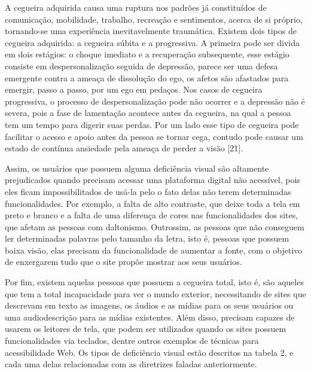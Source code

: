 \documentclass[a4paper]{article}
\begin{document}
\begin{titlepage}
A cegueira adquirida causa uma ruptura nos padrões já constituídos de comunicação, mobilidade, trabalho, recreação e sentimentos, acerca de si próprio, tornando-se uma experiência inevitavelmente traumática. Existem dois tipos de cegueira adquirida: a cegueira súbita e a progressiva. A primeira pode ser divida em dois estágios: o choque imediato e a recuperação subsequente, esse estágio consiste em despersonalização seguida de depressão, parece ser uma defesa emergente contra a ameaça de dissolução do ego, os afetos são afastados para emergir, passo a passo, por um ego em pedaços. Nos casos de cegueira progressiva, o processo de despersonalização pode não ocorrer e a depressão não é severa, pois a fase de lamentação acontece antes da cegueira, na qual a pessoa tem um tempo para digerir suas perdas. Por um lado esse tipo de cegueira pode facilitar o acesso e apoio antes da pessoa se tornar cega, contudo pode causar um estado de contínua ansiedade pela ameaça de perder a visão [21].

Assim, os usuários que possuem alguma deficiência visual são altamente prejudicados quando precisam acessar uma plataforma digital não acessível, pois eles ficam impossibilitados de usá-la pelo o fato delas não terem determinadas funcionalidades. Por exemplo, a falta de alto contraste, que deixe toda a tela em preto e branco e a falta de uma diferença de cores nas funcionalidades dos sites, que afetam as pessoas com daltonismo. Outrossim, as pessoas que não conseguem ler determinadas palavras pelo tamanho da letra, isto é, pessoas que possuem baixa visão, elas precisam da funcionalidade de aumentar a fonte, com o objetivo de enxergarem tudo que o site propõe mostrar aos seus usuários.

Por fim, existem aquelas pessoas que possuem a cegueira total, isto é, são aqueles que tem a total incapacidade para ver o mundo exterior, necessitando de sites que descrevam em texto as imagens, os áudios e as mídias para os seus usuários ou uma audiodescrição para as mídias existentes. Além disso, precisam capazes de usarem os leitores de tela, que podem ser utilizados quando os sites possuem funcionalidades via teclados, dentre outros exemplos de técnicas para acessibilidade Web. Os tipos de deficiência visual estão descritos na tabela 2, e cada uma delas relacionadas com as diretrizes faladas anteriormente.\\


\end{titlepage}
\end{document}
